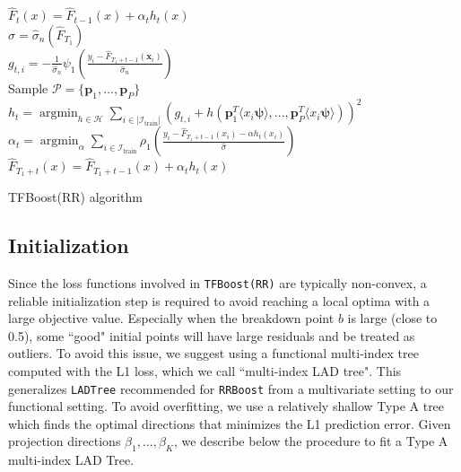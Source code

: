 \documentclass{article}
\DeclareMathOperator*{\argmin}{argmin}
\begin{document}
\begin{algorithm}[H]
{       \hspace{1cm}   $\hat{F}_{t}(x) = \hat{F}_{t-1}(x) +  \alpha_t h_t(x)$  \\
        }
      \hspace{1cm}  $\hat{\sigma} =  \hat{\sigma}_n(\hat{F}_{T_1})$ \\
     \Stageb{}
     \hspace{1cm}
     {
            \hspace{1cm} $g_{t,i} = - \frac{1}{\hat{\sigma}_n }
	    \psi_1 \left(\frac{y_{i}  - \hat{F}_{T_1 + t-1}(\mathbf{x}_{i})}{\hat{\sigma}_n} \right)$ \\
	        \hspace{1cm}  Sample $\mathcal{P} = \{\mathbf{p}_1,..., \mathbf{p}_P\}$ \\ 
                \hspace{1cm}  $h_t = \argmin_{h \in \mathcal{H}}  \sum_{i \in |\mathcal{I}_{\text{train}}|}  \left(g_{t,i} + h\left( \mathbf{p}_1^T\langle x_i \boldsymbol{\psi} \rangle, ..., \mathbf{p}_P^T\langle x_i \boldsymbol{\psi} \rangle \right) \right)^2$ \\
                  \hspace{1cm}  $\alpha_t = \argmin_{\alpha} \sum_{i \in \mathcal{I}_{\text{train}}} \rho_1 \left( \frac{y_i  - \hat{F}_{T_1 + t-1}(x_i)  - \alpha h_t\left( x_i \right)}{\hat{\sigma}} \right)$ \\
            \hspace{1cm} $\hat{F}_{T_1 + t}(x) = \hat{F}_{T_1 + t-1}(x) +   \alpha_t h_t(x)$ 
        }
          \caption{TFBoost(RR) algorithm}
            \label{code-rrboost}
\end{algorithm}


\subsection{Initialization}
\label{sec:init}
Since the loss functions involved in \texttt{TFBoost(RR)} are typically non-convex, a reliable initialization step is required to avoid reaching a local optima with a large objective value.  Especially when the breakdown point $b$ is large (close to 0.5), some ``good" initial points will have large residuals and be treated as outliers. 
To avoid this issue, we suggest using a functional multi-index tree computed with the L1 loss, which we call ``multi-index LAD tree".  This generalizes \texttt{LADTree} recommended for \texttt{RRBoost} from a multivariate setting to our functional setting.  To avoid overfitting, we use  a relatively shallow Type A tree which finds the optimal directions that minimizes the L1 prediction error.  Given projection directions $\beta_1,..., \beta_K$, we describe below the procedure to fit a Type A multi-index LAD Tree. 
\end{document}
